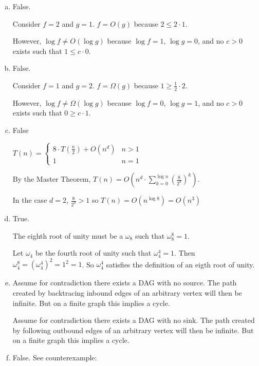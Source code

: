 \documentclass[10pt]{article}
\begin{document}
\begin{solution}

    \begin{enumerate}[(a)]
        \item {
            False. 

            Consider $f=2$ and $g = 1$. 
            $f = O(g)$ because $2 \leq 2 \cdot 1$. 

            However, $\log f \neq O(\log g)$ because $\log f = 1$,  
            $\log g = 0$, and no $c > 0$ exists such that $1 \leq c \cdot 0$. 
        }
        \item {
            False. 

            Consider $f=1$ and $g=2$. 
            $f = \Omega(g)$ because $1 \geq \frac{1}{2} \cdot 2$. 

            However, $\log f \neq \Omega(\log g)$ because $\log f = 0$,  
            $\log g = 1$, and no $c > 0$ exists such that $0 \geq c \cdot 1$. 
        }
        \item {
            False

            $T(n) = 
            \begin{cases}
                8 \cdot T(\frac{n}{2}) + O(n^d) & n > 1 \\
                1 & n = 1
            \end{cases}
            $

            By the Master Theorem, 
            $\displaystyle T(n) = O(n^d \cdot \sum_{k=0}^{\log n} (\frac{8}{2^d})^k)$. 

            In the case $d=2$, $\displaystyle \frac{8}{2^d} > 1$ so $T(n) = O(n^{\log 8}) = O(n^3)$
        }
        \item {
            True. 
            
            The eighth root of unity must be a $\omega_8$ such that $\omega_8^8 = 1$. 
            
            Let $\omega_4$ be the fourth root of unity such that $\omega_4^4 = 1$. 
            Then $\omega_4^8 = (\omega_4^4)^2 = 1^2 = 1$. 
            So  $\omega_4^4$ satisfies the definition of an eigth root of unity. 
        }
        \item {
            Assume for contradiction there exists a DAG with no source. 
            The path created by backtracing inbound edges of an arbitrary vertex will then be infinite. 
            But on a finite graph this implies a cycle. 

            Assume for contradiction there exists a DAG with no sink. 
            The path created by following outbound edges of an arbitrary vertex will then be infinite. 
            But on a finite graph this implies a cycle. 
        }
        \item {
            False. See counterexample:

}
\end{enumerate}
\end{solution}
\end{document}
